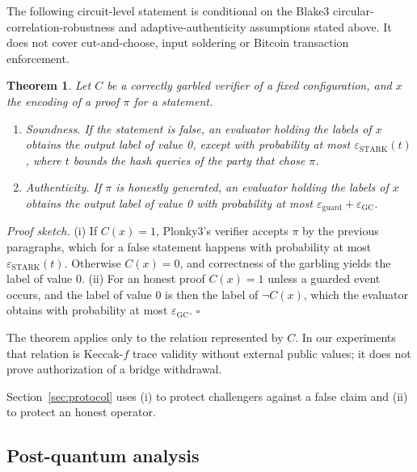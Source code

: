 \documentclass[11pt]{article}
\newtheorem{theorem}{Theorem}
\begin{document}
\noindent The following circuit-level statement is conditional on the Blake3
circular-correlation-robustness and adaptive-authenticity assumptions stated
above. It does not cover cut-and-choose, input soldering or Bitcoin transaction
enforcement.

\begin{theorem}\label{thm:main}
Let $C$ be a correctly garbled verifier of a fixed configuration, and $x$ the
encoding of a proof $\pi$ for a statement.
\begin{enumerate}
  \item[(i)] \emph{Soundness.} If the statement is false, an evaluator holding the
    labels of $x$ obtains the output label of value 0, except with probability at
    most $\varepsilon_{\mathrm{STARK}}(t)$, where $t$ bounds the hash queries of
    the party that chose $\pi$.
  \item[(ii)] \emph{Authenticity.} If $\pi$ is honestly generated, an evaluator
    holding the labels of $x$ obtains the output label of value 0 with probability
    at most $\varepsilon_{\mathrm{guard}}+\varepsilon_{\mathrm{GC}}$.
\end{enumerate}
\end{theorem}

\noindent\emph{Proof sketch.} (i) If $C(x)=1$, Plonky3's verifier accepts $\pi$ by
the previous paragraphs, which for a false statement happens with probability at
most $\varepsilon_{\mathrm{STARK}}(t)$. Otherwise $C(x)=0$, and correctness of the
garbling yields the label of value 0. (ii) For an honest proof $C(x)=1$ unless a
guarded event occurs, and the label of value 0 is then the label of $\neg C(x)$,
which the evaluator obtains with probability at most
$\varepsilon_{\mathrm{GC}}$. \hfill$\square$

\smallskip\noindent The theorem applies only to the relation represented by
$C$. In our experiments that relation is Keccak-$f$ trace validity without
external public values; it does not prove authorization of a bridge withdrawal.

\smallskip\noindent Section~\ref{sec:protocol} uses (i) to protect challengers
against a false claim and (ii) to protect an honest operator.

\subsection{Post-quantum analysis}\label{sec:pq}
\end{document}
